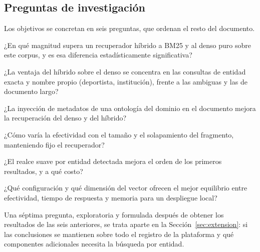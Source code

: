 \documentclass[11pt,letterpaper]{article}
\numberwithin{equation}{section}
\begin{document}
\subsection{Preguntas de investigación}
\label{sec:preguntas}
Los objetivos se concretan en seis preguntas, que ordenan el resto del documento.
\begin{description}[leftmargin=2.6em,style=nextline,itemsep=1pt]
  \item[\textbf{P1.}] ¿En qué magnitud supera un recuperador híbrido a BM25 y al denso puro sobre este corpus, y es esa diferencia estadísticamente significativa?
  \item[\textbf{P2.}] ¿La ventaja del híbrido sobre el denso se concentra en las consultas de entidad exacta y nombre propio (deportista, institución), frente a las ambiguas y las de documento largo?
  \item[\textbf{P3.}] ¿La inyección de metadatos de una ontología del dominio en el documento mejora la recuperación del denso y del híbrido?
  \item[\textbf{P4.}] ¿Cómo varía la efectividad con el tamaño y el solapamiento del fragmento, manteniendo fijo el recuperador?
  \item[\textbf{P5.}] ¿El realce suave por entidad detectada mejora el orden de los primeros resultados, y a qué costo?
  \item[\textbf{P6.}] ¿Qué configuración y qué dimensión del vector ofrecen el mejor equilibrio entre efectividad, tiempo de respuesta y memoria para un despliegue local?
\end{description}
Una séptima pregunta, exploratoria y formulada después de obtener los resultados de las seis anteriores, se trata aparte en la Sección~\ref{sec:extension}: si las conclusiones se mantienen sobre todo el registro de la plataforma y qué componentes adicionales necesita la búsqueda por entidad.
\end{document}
